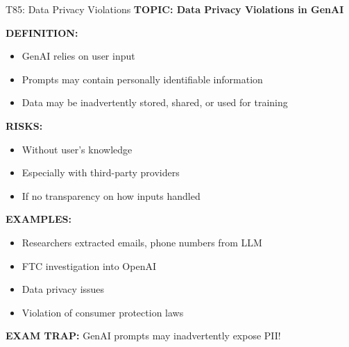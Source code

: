 \documentclass[8pt]{beamer}
\begin{document}
	\begin{frame}{T85: Data Privacy Violations}
		\fontsize{6.5}{7.5}\selectfont
		\textbf{TOPIC: Data Privacy Violations in GenAI}
		
		\vspace{0.1cm}
		\textbf{DEFINITION:}
		\begin{itemize}
			\item GenAI relies on user input
			\item Prompts may contain personally identifiable information
			\item Data may be inadvertently stored, shared, or used for training
		\end{itemize}
		
		\vspace{0.1cm}
		\textbf{RISKS:}
		\begin{itemize}
			\item Without user's knowledge
			\item Especially with third-party providers
			\item If no transparency on how inputs handled
		\end{itemize}
		
		\vspace{0.1cm}
		\textbf{EXAMPLES:}
		\begin{itemize}
			\item Researchers extracted emails, phone numbers from LLM
			\item FTC investigation into OpenAI
			\item Data privacy issues
			\item Violation of consumer protection laws
		\end{itemize}
		
		\textcolor{myred}{\textbf{EXAM TRAP:}} GenAI prompts may \textcolor{myblue}{inadvertently expose PII}!
	\end{frame}
	
\end{document}
